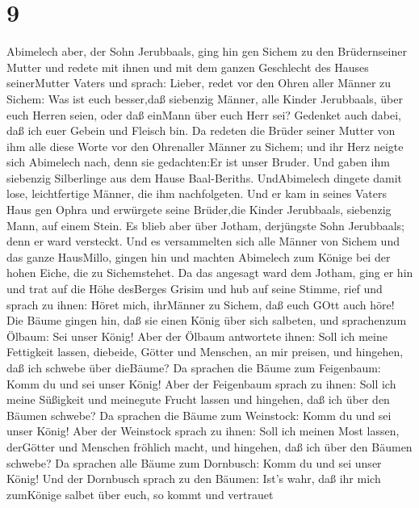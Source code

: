 \hypertarget{section-8}{%
\section{9}\label{section-8}}

 Abimelech aber, der Sohn Jerubbaals, ging hin gen Sichem zu
den Brüdernseiner Mutter und redete mit ihnen und mit dem ganzen
Geschlecht des Hauses seinerMutter Vaters und sprach: 
Lieber, redet vor den Ohren aller Männer zu Sichem: Was ist euch
besser,daß siebenzig Männer, alle Kinder Jerubbaals, über euch Herren
seien, oder daß einMann über euch Herr sei? Gedenket auch dabei, daß ich
euer Gebein und Fleisch bin.  Da redeten die Brüder seiner
Mutter von ihm alle diese Worte vor den Ohrenaller Männer zu Sichem; und
ihr Herz neigte sich Abimelech nach, denn sie gedachten:Er ist unser
Bruder.  Und gaben ihm siebenzig Silberlinge aus dem Hause
Baal-Beriths. UndAbimelech dingete damit lose, leichtfertige Männer, die
ihm nachfolgeten.  Und er kam in seines Vaters Haus gen
Ophra und erwürgete seine Brüder,die Kinder Jerubbaals, siebenzig Mann,
auf einem Stein. Es blieb aber über Jotham, derjüngste Sohn Jerubbaals;
denn er ward versteckt.  Und es versammelten sich alle
Männer von Sichem und das ganze HausMillo, gingen hin und machten
Abimelech zum Könige bei der hohen Eiche, die zu Sichemstehet.
 Da das angesagt ward dem Jotham, ging er hin und trat auf
die Höhe desBerges Grisim und hub auf seine Stimme, rief und sprach zu
ihnen: Höret mich, ihrMänner zu Sichem, daß euch GOtt auch höre!
 Die Bäume gingen hin, daß sie einen König über sich
salbeten, und sprachenzum Ölbaum: Sei unser König!  Aber der
Ölbaum antwortete ihnen: Soll ich meine Fettigkeit lassen, diebeide,
Götter und Menschen, an mir preisen, und hingehen, daß ich schwebe über
dieBäume?  Da sprachen die Bäume zum Feigenbaum: Komm du
und sei unser König!  Aber der Feigenbaum sprach zu ihnen:
Soll ich meine Süßigkeit und meinegute Frucht lassen und hingehen, daß
ich über den Bäumen schwebe?  Da sprachen die Bäume zum
Weinstock: Komm du und sei unser König!  Aber der Weinstock
sprach zu ihnen: Soll ich meinen Most lassen, derGötter und Menschen
fröhlich macht, und hingehen, daß ich über den Bäumen schwebe?
 Da sprachen alle Bäume zum Dornbusch: Komm du und sei
unser König!  Und der Dornbusch sprach zu den Bäumen: Ist's
wahr, daß ihr mich zumKönige salbet über euch, so kommt und vertrauet
